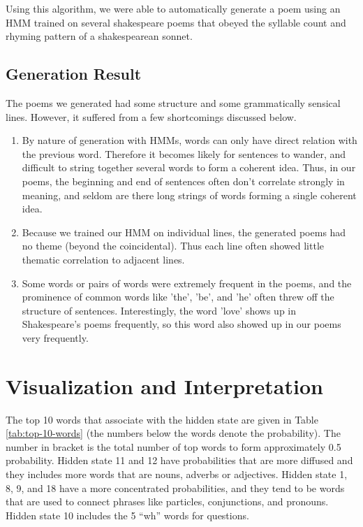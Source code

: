 Using this algorithm, we were able to automatically generate a poem using an HMM trained on several shakespeare poems that obeyed the syllable count and rhyming pattern of a shakespearean sonnet. 

\subsection*{Generation Result}

The poems we generated had some structure and some grammatically sensical lines. However, it suffered from a few shortcomings discussed below.

\begin{enumerate}

\item By nature of generation with HMMs, words can only have direct relation with the previous word. Therefore it becomes likely for sentences to wander, and difficult to string together several words to form a coherent idea. Thus, in our poems, the beginning and end of sentences often don't correlate strongly in meaning, and seldom are there long strings of words forming a single coherent idea. 

\item Because we trained our HMM on individual lines, the generated poems had no theme (beyond the coincidental). Thus each line often showed little thematic correlation to adjacent lines.

\item Some words or pairs of words were extremely frequent in the poems, and the prominence of common words like 'the', 'be', and 'he' often threw off the structure of sentences. Interestingly, the word 'love' shows up in Shakespeare's poems frequently, so this word also showed up in our poems very frequently.

\end{enumerate}

\medskip

\section*{Visualization and Interpretation}

The top 10 words that associate with the hidden state are given in Table \ref{tab:top-10-words} (the numbers below the words denote the probability). The number in bracket is the total number of top words to form approximately 0.5 probability. Hidden state 11 and 12 have probabilities that are more diffused and they includes more words that are nouns, adverbs or adjectives. Hidden state 1, 8, 9, and 18 have a more concentrated probabilities, and they tend to be words that are used to connect phrases like particles, conjunctions, and pronouns. Hidden state 10 includes the 5 ``wh'' words for questions. 

